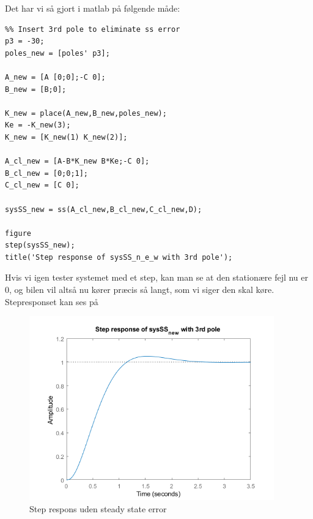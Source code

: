 Det har vi så gjort i matlab på følgende måde:

\begin{lstlisting}
%% Insert 3rd pole to eliminate ss error
p3 = -30;
poles_new = [poles' p3];

A_new = [A [0;0];-C 0];
B_new = [B;0];

K_new = place(A_new,B_new,poles_new);
Ke = -K_new(3);
K_new = [K_new(1) K_new(2)];

A_cl_new = [A-B*K_new B*Ke;-C 0];
B_cl_new = [0;0;1];
C_cl_new = [C 0];

sysSS_new = ss(A_cl_new,B_cl_new,C_cl_new,D);

figure
step(sysSS_new);
title('Step response of sysSS_n_e_w with 3rd pole');
\end{lstlisting}

Hvis vi igen tester systemet med et step, kan man se at den stationære fejl nu er 0, og bilen vil altså nu kører præcis så langt, som vi siger den skal køre. Stepresponset kan ses på 

\begin{figure}[H]
	\centering
	\includegraphics[width = 300pt]{Img/StepOfSySS_new.png}
	\caption{Step respons uden steady state error}
	\label{fig:SteadyState_stepresponse}
\end{figure}